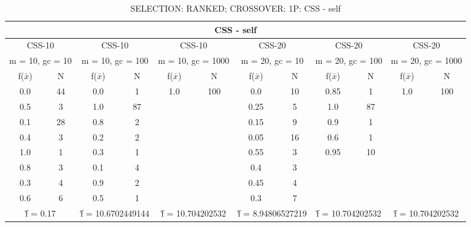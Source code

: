 \begin{table}[H]
	\centering
	\caption{SELECTION: RANKED; CROSSOVER: 1P: CSS - self}
	\begin{adjustbox}{width=1\textwidth}
		\begin{tabular}{ |c|c||c|c||c|c||c|c||c|c||c|c| }
			\hline
			\multicolumn{12}{|c|}{CSS - self} \\
			\hline
			\multicolumn{2}{|c||}{CSS-10} & \multicolumn{2}{c||}{CSS-10} & \multicolumn{2}{c||}{CSS-10} & \multicolumn{2}{c||}{CSS-20} & \multicolumn{2}{c||}{CSS-20} & \multicolumn{2}{c|}{CSS-20}\\
			\hline
			\multicolumn{2}{|c||}{m = 10, gc = 10} & \multicolumn{2}{c||}{m = 10, gc = 100} & \multicolumn{2}{c||}{m = 10, gc = 1000} & \multicolumn{2}{c||}{m = 20, gc = 10} & \multicolumn{2}{c||}{m = 20, gc = 100} & \multicolumn{2}{c|}{m = 20, gc = 1000}\\
			\hline
			f($\bar{x}$) & N & f($\bar{x}$) & N & f($\bar{x}$) & N & f($\bar{x}$) & N & f($\bar{x}$) & N & f($\bar{x}$) & N\\
			\hline
			\hline
			0.0 & 44 & 0.0 & 1 & 1.0 & 100 & 0.0 & 10 & 0.85 & 1 & 1.0 & 100\\
			0.5 & 3 & 1.0 & 87 &   &   & 0.25 & 5 & 1.0 & 87 &   &  \\
			0.1 & 28 & 0.8 & 2 &   &   & 0.15 & 9 & 0.9 & 1 &   &  \\
			0.4 & 3 & 0.2 & 2 &   &   & 0.05 & 16 & 0.6 & 1 &   &  \\
			1.0 & 1 & 0.3 & 1 &   &   & 0.55 & 3 & 0.95 & 10 &   &  \\
			0.8 & 3 & 0.1 & 4 &   &   & 0.4 & 3 &   &   &   &  \\
			0.3 & 4 & 0.9 & 2 &   &   & 0.45 & 4 &   &   &   &  \\
			0.6 & 6 & 0.5 & 1 &   &   & 0.3 & 7 &   &   &   &  \\
			\hline
			\multicolumn{2}{|c||}{\^{f} = 0.17} & \multicolumn{2}{c||}{\^{f} = 10.6702449144} & \multicolumn{2}{c||}{\^{f} = 10.704202532} & \multicolumn{2}{c||}{\^{f} = 8.94806527219} & \multicolumn{2}{c||}{\^{f} = 10.704202532} & \multicolumn{2}{c|}{\^{f} = 10.704202532}\\
			\hline
		\end{tabular}
	\end{adjustbox}
\end{table}
